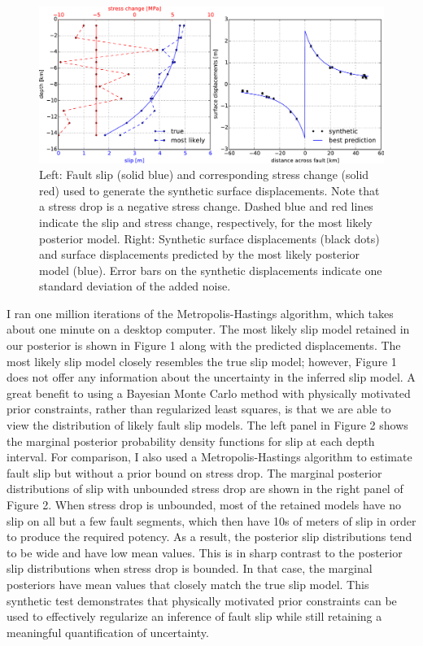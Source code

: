\documentclass[12pt]{article}
\begin{document}
\begin{figure}
\includegraphics[width=1.0\textwidth]{figure_1}
\caption{Left: Fault slip (solid blue) and corresponding stress change (solid red) used to generate the synthetic surface displacements. Note that a stress drop is a negative stress change.  Dashed blue and red lines indicate the slip and stress change, respectively, for the most likely posterior model. Right: Synthetic surface displacements (black dots) and surface displacements predicted by the most likely posterior model (blue).  Error bars on the synthetic displacements indicate one standard deviation of the added noise.}  
\end{figure}

I ran one million iterations of the Metropolis-Hastings algorithm, which takes about one minute on a desktop computer. The most likely slip model retained in our posterior is shown in Figure 1 along with the predicted displacements.  The most likely slip model closely resembles the true slip model; however, Figure 1 does not offer any information about the uncertainty in the inferred slip model. A great benefit to using a Bayesian Monte Carlo method with physically motivated prior constraints, rather than regularized least squares, is that we are able to view the distribution of likely fault slip models.  The left panel in Figure 2 shows the marginal posterior probability density functions for slip at each depth interval.  For comparison, I also used a Metropolis-Hastings algorithm to estimate fault slip but without a prior bound on stress drop.  The marginal posterior distributions of slip with unbounded stress drop are shown in the right panel of Figure 2. When stress drop is unbounded, most of the retained models have no slip on all but a few fault segments, which then have 10s of meters of slip in order to produce the required potency.  As a result, the posterior slip distributions tend to be wide and have low mean values.  This is in sharp contrast to the posterior slip distributions when stress drop is bounded.  In that case, the marginal posteriors have mean values that closely match the true slip model.  This synthetic test demonstrates that physically motivated prior constraints can be used to effectively regularize an inference of fault slip while still retaining a meaningful quantification of uncertainty.   
\end{document}
